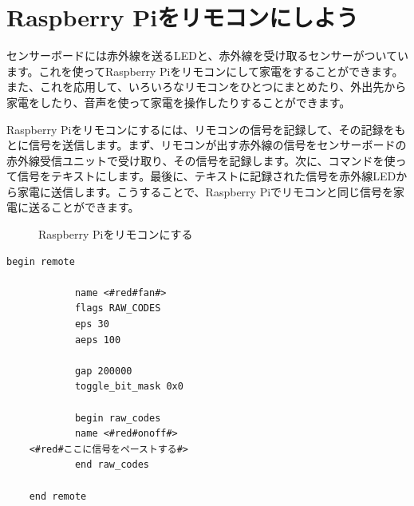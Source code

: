 \documentclass[text05.tex]{subfiles}
\begin{document}
\newpage
\section{Raspberry Piをリモコンにしよう}
センサーボードには赤外線を送るLEDと、赤外線を受け取るセンサーがついています。これを使ってRaspberry Piをリモコンにして家電をすることができます。また、これを応用して、いろいろなリモコンをひとつにまとめたり、外出先から家電をしたり、音声を使って家電を操作したりすることができます。

Raspberry Piをリモコンにするには、リモコンの信号を記録して、その記録をもとに信号を送信します。まず、リモコンが出す赤外線の信号をセンサーボードの赤外線受信ユニットで受け取り、その信号を記録します。次に、コマンドを使って信号をテキストにします。最後に、テキストに記録された信号を赤外線LEDから家電に送信します。こうすることで、Raspberry Piでリモコンと同じ信号を家電に送ることができます。
\begin{figure}[H]
    \centering
 
    \caption{Raspberry Piをリモコンにする}
\end{figure}
\begin{lstlisting}[caption=template.lircd.conf,label=template.lircd.conf]
    begin remote
    
            name <#red#fan#>
            flags RAW_CODES
            eps 30
            aeps 100
    
            gap 200000
            toggle_bit_mask 0x0
    
            begin raw_codes
            name <#red#onoff#>
    <#red#ここに信号をペーストする#>
            end raw_codes
    
    end remote
    \end{lstlisting}

\newpage
\end{document}
